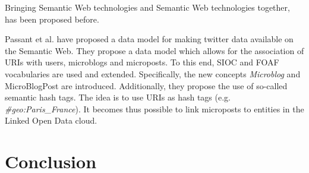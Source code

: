 \documentclass{llncs}
\begin{document}
Bringing Semantic Web technologies and Semantic Web technologies together, has been proposed before.

Passant et al. \cite{key:smob} have proposed a data model for making twitter
data available on the Semantic Web. They propose a data model which allows for the association of URIs with users, microblogs and microposts. To this end, SIOC and FOAF vocabularies are used and extended. Specifically, the new concepts \emph{Microblog} and {MicroBlogPost} are introduced. Additionally, they propose the use of so-called semantic hash tags. The idea is to use URIs as hash tags (e.g. \emph{\#geo:Paris\_France}). It becomes thus possible to link microposts to entities in the Linked Open Data cloud.
\section{Conclusion}







\end{document}
